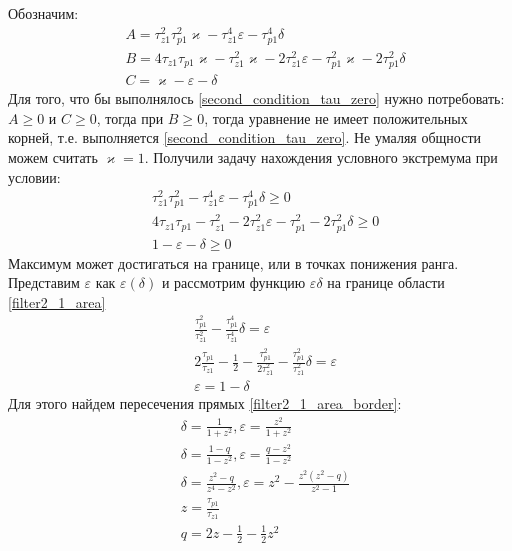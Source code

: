 \documentclass[a4paper,14pt]{extarticle} %
\begin{document}
Обозначим:
 \begin{equation}
 \begin{aligned}
&A = \tau_{z1}^2\tau_{p1}^2\varkappa - \tau_{z1}^4\varepsilon - \tau_{p1}^4\delta\\
&B = 4\tau_{z1}\tau_{p1}\varkappa - \tau_{z1}^2\varkappa - 2\tau_{z1}^2\varepsilon - \tau_{p1}^2\varkappa - 2\tau_{p1}^2\delta\\
&C = \varkappa-\varepsilon - \delta
 \end{aligned}
\end{equation}
Для того, что бы выполнялось \eqref{second_condition_tau_zero} нужно потребовать: $A \geq 0$ и $C \geq 0$, тогда  при $B \geq 0$, тогда уравнение не имеет положительных корней, т.е. выполняется \eqref{second_condition_tau_zero}. Не умаляя общности можем считать $\varkappa = 1$. Получили задачу нахождения условного экстремума при условии:
 \begin{equation}\label{filter2_1_area}
 \begin{aligned}
&\tau_{z1}^2\tau_{p1}^2 - \tau_{z1}^4\varepsilon - \tau_{p1}^4\delta \geq 0\\
&4\tau_{z1}\tau_{p1} - \tau_{z1}^2 - 2\tau_{z1}^2\varepsilon - \tau_{p1}^2 - 2\tau_{p1}^2\delta \geq 0\\
&1-\varepsilon - \delta \geq 0
 \end{aligned}
\end{equation}
Максимум может достигаться на границе, или в точках понижения ранга. Представим $\varepsilon$ как $\varepsilon(\delta)$ и рассмотрим функцию $\varepsilon\delta$ на границе области \eqref{filter2_1_area}
 \begin{equation}\label{filter2_1_area_border}
 \begin{aligned}
&\frac{\tau_{p1}^2}{\tau_{z1}^2} - \frac{\tau_{p1}^4}{\tau_{z1}^4}\delta =\varepsilon\\
&2\frac{\tau_{p1}}{\tau_{z1}} - \frac{1}{2} - \frac{\tau_{p1}^2}{2\tau_{z1}^2} - \frac{\tau_{p1}^2}{\tau_{z1}^2}\delta =  \varepsilon\\
&\varepsilon = 1 - \delta
 \end{aligned}
\end{equation}
 Для этого найдем пересечения прямых \eqref{filter2_1_area_border}:
  \begin{equation}
 \begin{aligned}
&\delta = \frac{1}{1+z^2}, \varepsilon = \frac{z^2}{1+z^2}\\
&\delta = \frac{1-q}{1-z^2}, \varepsilon = \frac{q-z^2}{1-z^2}\\
&\delta = \frac{z^2-q}{z^4-z^2}, \varepsilon = z^2 - \frac{z^2(z^2-q)}{z^2-1}\\
&z = \frac{\tau_{p1}}{\tau_{z1}}\\
&q = 2z - \frac{1}{2} - \frac{1}{2}z^2\\
 \end{aligned}
\end{equation}
\end{document}
